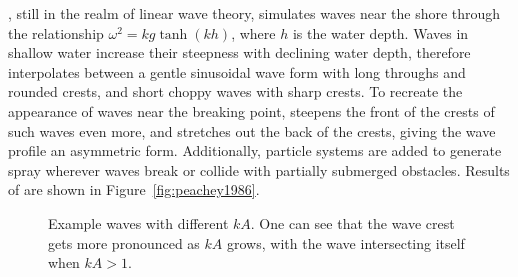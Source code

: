 \cite{Peachey:1986}, still in the realm of linear
wave theory, simulates waves near the shore through the relationship
$\omega^2=kg\tanh (kh)$, where $h$ is the water depth. Waves in shallow
water increase their steepness with declining water depth, \citeauthor{Peachey:1986}
therefore interpolates between a gentle sinusoidal wave form with long throughs
and rounded crests, and short choppy waves with sharp crests. To recreate the
appearance of waves near the breaking point, \citeauthor{Peachey:1986} steepens the front
of the crests of such waves even more, and stretches out the back of the crests,
giving the wave profile an asymmetric form.
Additionally, particle systems are added to generate spray wherever waves break or
collide with partially submerged obstacles.
Results of \cite{Peachey:1986} are shown in Figure~\ref{fig:peachey1986}.
%
\begin{figure}[p]
\caption{Example waves with different $kA$. One can see that the wave crest gets more pronounced as $kA$ grows,
with the wave intersecting itself when $kA > 1$.}
\label{fig:trochoid:crests}
\end{figure}
%
%
